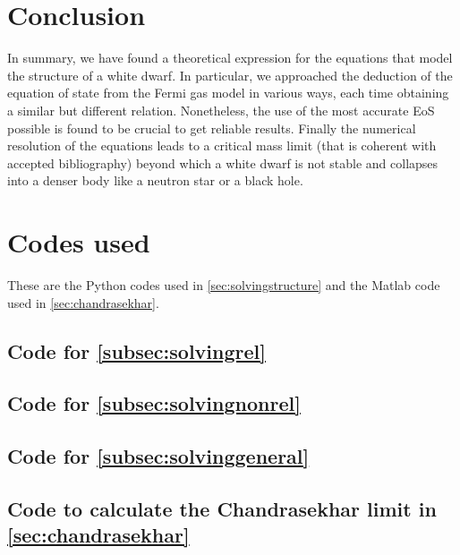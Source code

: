 \documentclass[a4paper]{article}
\begin{document}
\section{Conclusion}
In summary, we have found a theoretical expression for the equations that model the structure of a white dwarf. In particular, we approached the deduction of the equation of state from the Fermi gas model in various ways, each time obtaining a similar but different relation. Nonetheless, the use of the most accurate EoS possible is found to be crucial to get reliable results. Finally the numerical resolution of the equations leads to a critical mass limit (that is coherent with accepted bibliography) beyond which a white dwarf is not stable and collapses into a denser body like a neutron star or a black hole.



\newpage
\appendix
\section {Codes used} \label{sec:codes}
These are the Python codes used in \autoref{sec:solvingstructure} and the Matlab code used in \autoref{sec:chandrasekhar}.

\subsection{Code for \autoref{subsec:solvingrel}}

\subsection{Code for \autoref{subsec:solvingnonrel}}

\subsection{Code for \autoref{subsec:solvinggeneral}}


\subsection{Code to calculate the Chandrasekhar limit in \autoref{sec:chandrasekhar}} \label{sec:code_chandrasekhar}


\end{document}

